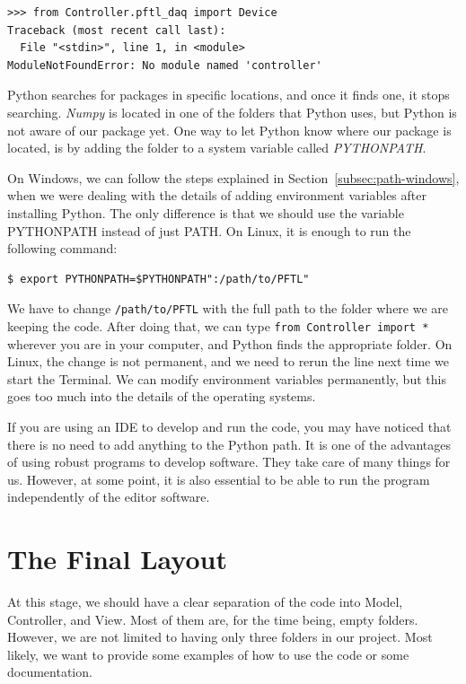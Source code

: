 \begin{verbatim}
>>> from Controller.pftl_daq import Device
Traceback (most recent call last):
  File "<stdin>", line 1, in <module>
ModuleNotFoundError: No module named 'controller'
\end{verbatim}

Python searches for packages in specific locations, and once it finds one, it stops searching. \emph{Numpy} is located in one of the folders that Python uses, but Python is not aware of our package yet. One way to let Python know where our package is located, is by adding the folder to a system variable called \emph{PYTHONPATH}.

On Windows, we can follow the steps explained in Section~\ref{subsec:path-windows}, when we were dealing with the details of adding environment variables after installing Python. The only difference is that we should use the variable PYTHONPATH instead of just PATH. On Linux, it is enough to run the following command:

\begin{verbatim}
$ export PYTHONPATH=$PYTHONPATH":/path/to/PFTL"
\end{verbatim}

We have to change \texttt{/path/to/PFTL} with the full path to the folder where we are keeping the code. After doing that, we can type \texttt{from Controller import *} wherever you are in your computer, and Python finds the appropriate folder. On Linux, the change is not permanent, and we need to rerun the line next time we start the Terminal. We can modify environment variables permanently, but this goes too much into the details of the operating systems.

If you are using an IDE to develop and run the code, you may have noticed that there is no need to add anything to the Python path. It is one of the advantages of using robust programs to develop software. They take care of many things for us. However, at some point, it is also essential to be able to run the program independently of the editor software.

\section{The Final Layout}\label{sec:final-layout}
At this stage, we should have a clear separation of the code into Model, Controller, and View. Most of them are, for the time being, empty folders. However, we are not limited to having only three folders in our project. Most likely, we want to provide some examples of how to use the code or some documentation.

